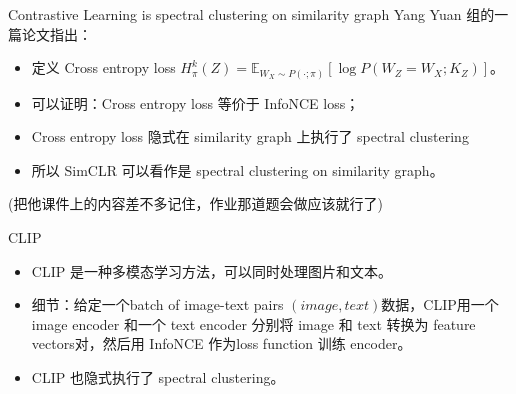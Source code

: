 \begin{frame}{Contrastive Learning is spectral clustering on similarity graph}
    Yang Yuan 组的一篇论文指出：
    \begin{itemize}
        \item 定义 Cross entropy loss $H_\pi^{k}(Z) = \mathbb{E}_{W_X\sim P(\cdot; \pi)} \left[ \log P(W_Z = W_X; K_Z) \right]$。
        \item 可以证明：Cross entropy loss 等价于 InfoNCE loss；
        \item Cross entropy loss 隐式在 similarity graph 上执行了 spectral clustering
        \item 所以 SimCLR 可以看作是 spectral clustering on similarity graph。
    \end{itemize}
    (把他课件上的内容差不多记住，作业那道题会做应该就行了)
\end{frame}

\begin{frame}{CLIP}
    \begin{itemize}
        \item CLIP 是一种多模态学习方法，可以同时处理图片和文本。
        \item 细节：给定一个batch of image-text pairs $(image, text)$数据，CLIP用一个 image encoder 和一个 text encoder 分别将 image 和 text 转换为 feature vectors对，然后用 InfoNCE 作为loss function 训练 encoder。
        \item CLIP 也隐式执行了 spectral clustering。
    \end{itemize}
\end{frame}
